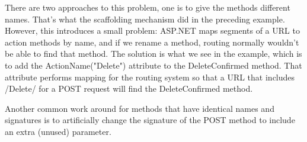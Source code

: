 \documentclass{report}
\begin{document}
    There are two approaches to this problem, one is to give the methods different
    names. That's what the scaffolding mechanism did in the preceding example.
    However, this introduces a small problem: ASP.NET maps segments of a URL to
    action methods by name, and if we rename a method, routing normally wouldn't
    be able to find that method. The solution is what we see in the example, which
    is to add the ActionName("Delete") attribute to the DeleteConfirmed method. That
    attribute performs mapping for the routing system so that a URL that includes /Delete/
    for a POST request will find the DeleteConfirmed method.

    Another common work around for methods that have identical names and signatures is
    to artificially change the signature of the POST method to include an extra (unused)
    parameter.
\end{document}
